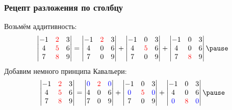 \begin{frame}
    \frametitle{Рецепт разложения по столбцу}
    Возьмём аддитивность:
    \[
\begin{vmatrix}
    -1 & \red{2} & 3 \\
    4 & \red{5} & 6 \\
    7 & \red{8} & 9 \\
\end{vmatrix}  =       
\begin{vmatrix}
    -1 & \red{2} & 3 \\
    4 & 0 & 6 \\
    7 & 0 & 9 \\
\end{vmatrix} +
\begin{vmatrix}
    -1 & 0 & 3 \\
    4 & \red{5} & 6 \\
    7 & 0 & 9 \\
\end{vmatrix} +
\begin{vmatrix}
    -1 & 0 & 3 \\
    4 & 0 & 6 \\
    7 & \red{8} & 9 \\
\end{vmatrix} \pause
    \]
    Добавим немного принципа Кавальери:
\[
    \begin{vmatrix}
        -1 & \red{2} & 3 \\
        4 & \red{5} & 6 \\
        7 & \red{8} & 9 \\
    \end{vmatrix}  =       
    \begin{vmatrix}
        \blue{0} & \red{2} & \blue{0} \\
        4 & 0 & 6 \\
        7 & 0 & 9 \\
    \end{vmatrix} +
    \begin{vmatrix}
        -1 & 0 & 3 \\
\blue{0} & \red{5} & \blue{0} \\
        7 & 0 & 9 \\
    \end{vmatrix} +
    \begin{vmatrix}
        -1 & 0 & 3 \\
        4 & 0 & 6 \\
\blue{0} & \red{8} & \blue{0} \\
    \end{vmatrix} \pause
\]
\end{frame}
